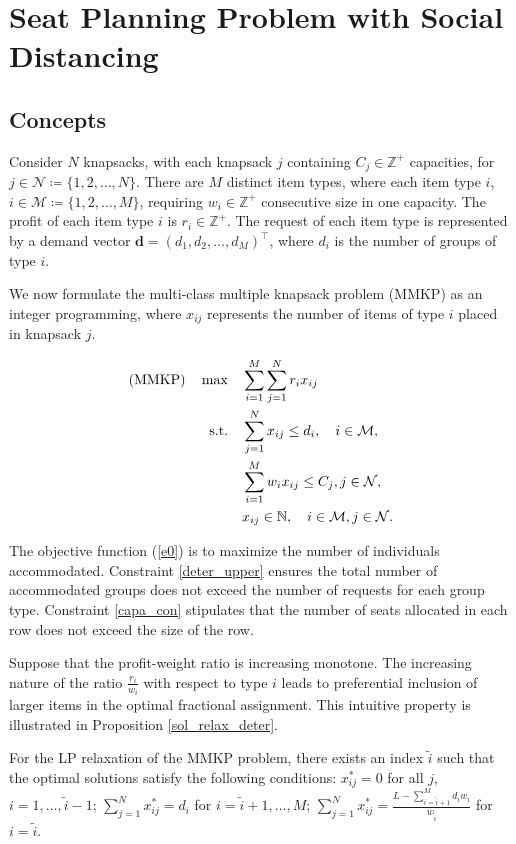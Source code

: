\section{Seat Planning Problem with Social Distancing}\label{problem_description}

\subsection{Concepts}
Consider $N$ knapsacks, with each knapsack $j$ containing $C_j \in \mathbb{Z}^{+}$ capacities, for $j \in \mathcal{N} \coloneqq \{1,2, \ldots, N\}$. There are $M$ distinct item types, where each item type $i$, $i \in \mathcal{M} \coloneqq \{1, 2, \ldots, M\}$, requiring $w_i \in \mathbb{Z}^{+}$ consecutive size in one capacity. The profit of each item type $i$ is $r_{i} \in \mathbb{Z}^{+}$. The request of each item type is represented by a demand vector $\mathbf{d} = (d_1, d_2, \ldots, d_M)^{\intercal}$, where $d_i$ is the number of groups of type $i$.

We now formulate the multi-class multiple knapsack problem (MMKP) as an integer programming, where $x_{ij}$ represents the number of items of type $i$ placed in knapsack $j$.

\begin{align}
(\text{MMKP}) \quad \max \quad & \sum_{i=1}^{M}  \sum_{j= 1}^{N} r_{i} x_{ij} \label{e0} \\
\text {s.t.} \quad & \sum_{j= 1}^{N} x_{ij} \leq d_{i}, \quad i \in \mathcal{M}, \label{deter_upper}\\ 
& \sum_{i=1}^{M} w_{i} x_{ij} \leq C_j, j \in \mathcal{N}, \label{capa_con} \\
& x_{ij} \in \mathbb{N}, \quad i \in \mathcal{M}, j \in \mathcal{N}. \notag 
\end{align}


The objective function (\ref{e0}) is to maximize the number of individuals accommodated. Constraint \eqref{deter_upper} ensures the total number of accommodated groups does not exceed the number of requests for each group type. Constraint \eqref{capa_con} stipulates that the number of seats allocated in each row does not exceed the size of the row.


Suppose that the profit-weight ratio is increasing monotone. The increasing nature of the ratio $\frac{r_i}{w_i}$ with respect to type $i$ leads to preferential inclusion of larger items in the optimal fractional assignment. This intuitive property is illustrated in Proposition \ref{sol_relax_deter}. 


\begin{prop}\label{sol_relax_deter}
For the LP relaxation of the \textup{MMKP} problem, there exists an index $\tilde{i}$ such that the optimal solutions satisfy the following conditions: $x_{ij}^{*} = 0$ for all $j$, $i = 1,\ldots, \tilde{i}-1$; $\sum_{j=1}^{N} x_{ij}^{*} = d_{i}$ for $i = \tilde{i}+1,\ldots, M$; $\sum_{j=1}^{N} x_{ij}^{*} = \frac{L - \sum_{i = \tilde{i}+1}^{M} {d_i w_i}}{w_{\tilde{i}}}$ for $i = \tilde{i}$.
\end{prop}